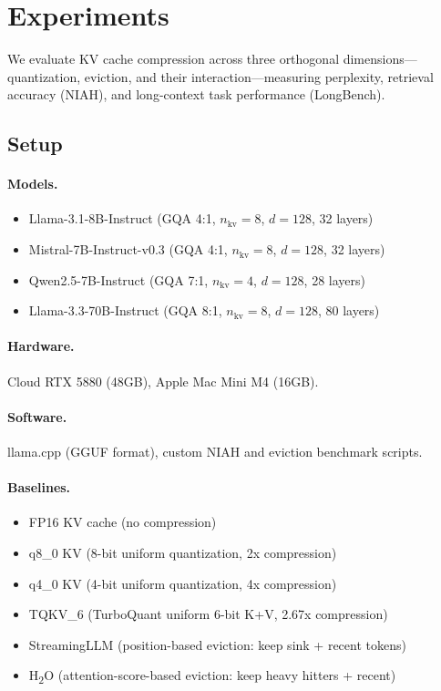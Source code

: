 \section{Experiments}
\label{sec:experiments}

We evaluate KV cache compression across three orthogonal dimensions---quantization, eviction, and their interaction---measuring perplexity, retrieval accuracy (NIAH), and long-context task performance (LongBench).

\subsection{Setup}

\paragraph{Models.}
\begin{itemize}
    \item Llama-3.1-8B-Instruct (GQA 4:1, $n_\text{kv}=8$, $d=128$, 32 layers)
    \item Mistral-7B-Instruct-v0.3 (GQA 4:1, $n_\text{kv}=8$, $d=128$, 32 layers)
    \item Qwen2.5-7B-Instruct (GQA 7:1, $n_\text{kv}=4$, $d=128$, 28 layers)
    \item Llama-3.3-70B-Instruct (GQA 8:1, $n_\text{kv}=8$, $d=128$, 80 layers)
\end{itemize}

\paragraph{Hardware.} Cloud RTX 5880 (48GB), Apple Mac Mini M4 (16GB).

\paragraph{Software.} llama.cpp (GGUF format), custom NIAH and eviction benchmark scripts.

\paragraph{Baselines.}
\begin{itemize}
    \item FP16 KV cache (no compression)
    \item q8\_0 KV (8-bit uniform quantization, 2x compression)
    \item q4\_0 KV (4-bit uniform quantization, 4x compression)
    \item TQKV\_6 (TurboQuant uniform 6-bit K+V, 2.67x compression)
    \item StreamingLLM (position-based eviction: keep sink + recent tokens)
    \item H\textsubscript{2}O (attention-score-based eviction: keep heavy hitters + recent)
\end{itemize}

